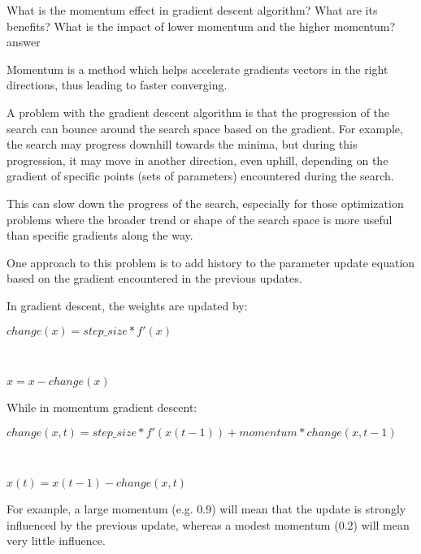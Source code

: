 \documentclass[11pt,letterpaper]{article}
\newcounter{problem}
\begin{document}
\begin{exercise}
    What is the momentum effect in gradient descent algorithm?
    What are its benefits?
    What is the impact of lower momentum and the higher momentum?
    \\ answer
    
    Momentum is a method which helps accelerate gradients vectors in the right directions, thus leading to faster converging.
    
    A problem with the gradient descent algorithm is that the progression of the search can bounce around the search space based on the gradient. For example, the search may progress downhill towards the minima, but during this progression, it may move in another direction, even uphill, depending on the gradient of specific points (sets of parameters) encountered during the search.
    
    This can slow down the progress of the search, especially for those optimization problems where the broader trend or shape of the search space is more useful than specific gradients along the way.

    One approach to this problem is to add history to the parameter update equation based on the gradient encountered in the previous updates.
    
    In gradient descent, the weights are updated by:
    \\\centerline{$change(x) = step\_size * f'(x)$}
    \\ \centerline{$x = x - change(x)$}
    While in momentum gradient descent:
    \\ \centerline{$change(x,t) = step\_size * f'(x(t-1)) + momentum * change(x,t-1)$}
    \\ \centerline{$x(t) = x(t-1) - change(x,t)$}
    
    For example, a large momentum (e.g. 0.9) will mean that the update is strongly influenced by the previous update, whereas a modest momentum (0.2) will mean very little influence.
\end{exercise}
\end{document}
